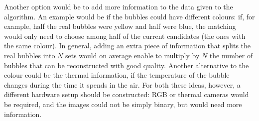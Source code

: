 Another option would be to add more information to the data given to the \match* algorithm.
An example would be if the bubbles could have different colours: if, for example, half the real bubbles were yellow and half were blue, the matching would only need to choose among half of the current candidates (the ones with the same colour).
In general, adding an extra piece of information that splits the real bubbles into $N$ sets would on average enable to multiply by $N$ the number of bubbles that can be reconstructed with good quality.
Another alternative to the colour could be the thermal information, if the temperature of the bubble changes during the time it spends in the air.
For both these ideas, however, a different hardware setup should be constructed: RGB or thermal cameras would be required, and the images could not be simply binary, but would need more information.
